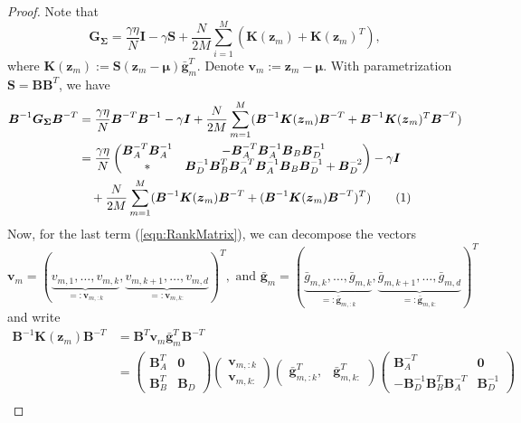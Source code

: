 \documentclass[a4paper, 11pt, oneside]{scrartcl}
\theoremstyle{break}
\newcommand{\matr}[1]{\boldsymbol{#1}}
\newcommand{\numberthis}{\addtocounter{equation}{1}\tag{\theequation}}
\numberwithin{equation}{section}
\begin{document}
				\begin{proof}
					Note that
					$$\matr{G_{\Sigma}} = \frac{\gamma \eta}{N} \matr{I} - \gamma \matr{S} + \frac{N}{2 M} \sum_{i=1}^M (\matr{K}(\matr{z}_m) + \matr{K}(\matr{z}_m)^T),$$
					where $\matr{K}(\matr{z}_m) := \matr{S} (\matr{z}_m - \matr{\mu}) \matr{\bar{g}}_m^T$.
					Denote $\matr{v}_m := \matr{z}_m - \matr{\mu}$.
					With parametrization $\matr{S} = \matr{B} \matr{B}^T$, we have
					\begin{align*}
						\matr{B}^{-1} \matr{G_{\Sigma}} \matr{B}^{-T} &= \frac{\gamma \eta}{N} \matr{B}^{-T} \matr{B}^{-1} - \gamma \matr{I} + \frac{N}{2 M} \sum_{m=1}^M (\matr{B}^{-1} \matr{K}(\matr{z}_m) \matr{B}^{-T} + \matr{B}^{-1} \matr{K}(\matr{z}_m)^T \matr{B}^{-T}) \\
						&= \frac{\gamma \eta}{N} \begin{pmatrix} \matr{B}_A^{-T} \matr{B}_A^{-1} & -\matr{B}_A^{-T} \matr{B}_A^{-1} \matr{B}_B \matr{B}_D^{-1} \\ * & \matr{B}_D^{-1} \matr{B}_B^T \matr{B}_A^{-T} \matr{B}_A^{-1} \matr{B}_B \matr{B}_D^{-1} + \matr{B}_D^{-2} \end{pmatrix} - \gamma \matr{I} \\
						&\quad + \frac{N}{2 M} \sum_{m=1}^M (\matr{B}^{-1} \matr{K}(\matr{z}_m) \matr{B}^{-T} + (\matr{B}^{-1} \matr{K}(\matr{z}_m) \matr{B}^{-T})^T) \numberthis{\label{eqn:RankMatrix}}
					\end{align*}
					Now, for the last term (\ref{eqn:RankMatrix}), we can decompose the vectors
					$$\matr{v}_m = (\underbrace{v_{m, 1}, \dots, v_{m, k}}_{=: \matr{v}_{m, :k}}, \underbrace{v_{m, k+1}, \dots, v_{m, d}}_{=:\matr{v}_{m, k:}})^T, \text{ and } \matr{\bar{g}}_{m} = (\underbrace{\bar{g}_{m, k}, \dots, \bar{g}_{m, k}}_{=: \matr{\bar{g}}_{m, :k}}, \underbrace{\bar{g}_{m, k+1}, \dots, \bar{g}_{m, d}}_{=:\matr{\bar{g}}_{m, k:}})^T$$
					and write
					\begin{align*}
						\matr{B}^{-1} \matr{K}(\matr{z}_m) \matr{B}^{-T} &= \matr{B}^T \matr{v}_m \matr{\bar{g}}_m^T \matr{B}^{-T} \\
						&= \begin{pmatrix} \matr{B}_A^T & \matr{0} \\ \matr{B}_B^T & \matr{B}_D \end{pmatrix} \begin{pmatrix} \matr{v}_{m, :k} \\ \matr{v}_{m, k:} \end{pmatrix} \begin{pmatrix} \matr{\bar{g}}_{m, :k}^T, & \matr{\bar{g}}_{m, k:}^T \end{pmatrix} \begin{pmatrix} \matr{B}_A^{-T} & \matr{0} \\ -\matr{B}_D^{-1} \matr{B}_B^T \matr{B}_A^{-T} & \matr{B}_D^{-1} \end{pmatrix} \\

\end{align*}
\end{proof}
\end{document}
